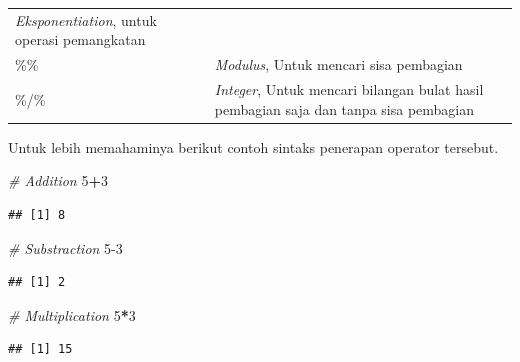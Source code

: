 \documentclass[]{book}
\newenvironment{Shaded}{\begin{snugshade}}{\end{snugshade}}
\newcommand{\CommentTok}[1]{\textcolor[rgb]{0.56,0.35,0.01}{\textit{#1}}}
\newcommand{\DecValTok}[1]{\textcolor[rgb]{0.00,0.00,0.81}{#1}}
\newcommand{\OperatorTok}[1]{\textcolor[rgb]{0.81,0.36,0.00}{\textbf{#1}}}
\theoremstyle{definition}
\theoremstyle{definition}
\theoremstyle{definition}
\theoremstyle{remark}
\begin{document}
\begin{longtable}[]{@{}ll@{}}
\begin{minipage}[t]{0.80\columnwidth}
\emph{Eksponentiation}, untuk operasi pemangkatan\strut
\end{minipage}\tabularnewline
\begin{minipage}[t]{0.14\columnwidth}\raggedright
\%\%\strut
\end{minipage} & \begin{minipage}[t]{0.80\columnwidth}\raggedright
\emph{Modulus}, Untuk mencari sisa pembagian\strut
\end{minipage}\tabularnewline
\begin{minipage}[t]{0.14\columnwidth}\raggedright
\%/\%\strut
\end{minipage} & \begin{minipage}[t]{0.80\columnwidth}\raggedright
\emph{Integer}, Untuk mencari bilangan bulat hasil pembagian saja dan tanpa sisa pembagian\strut
\end{minipage}\tabularnewline
\bottomrule
\end{longtable}

Untuk lebih memahaminya berikut contoh sintaks penerapan operator tersebut.

\begin{Shaded}
\begin{Highlighting}[]
\CommentTok{# Addition}
\DecValTok{5}\OperatorTok{+}\DecValTok{3}
\end{Highlighting}
\end{Shaded}

\begin{verbatim}
## [1] 8
\end{verbatim}

\begin{Shaded}
\begin{Highlighting}[]
\CommentTok{# Substraction}
\DecValTok{5-3}
\end{Highlighting}
\end{Shaded}

\begin{verbatim}
## [1] 2
\end{verbatim}

\begin{Shaded}
\begin{Highlighting}[]
\CommentTok{# Multiplication}
\DecValTok{5}\OperatorTok{*}\DecValTok{3}
\end{Highlighting}
\end{Shaded}

\begin{verbatim}
## [1] 15
\end{verbatim}
\end{document}
